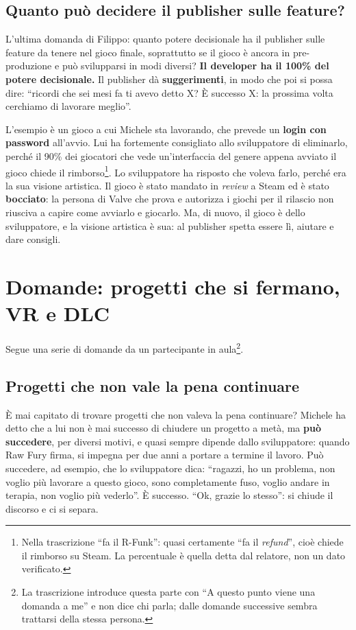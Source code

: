 \subsection{Quanto può decidere il publisher sulle feature?}

L'ultima domanda di Filippo: quanto potere decisionale ha il publisher sulle
feature da tenere nel gioco finale, soprattutto se il gioco è ancora in
pre-produzione e può svilupparsi in modi diversi? \textbf{Il developer ha il
100\% del potere decisionale.} Il publisher dà \textbf{suggerimenti}, in modo che
poi si possa dire: ``ricordi che sei mesi fa ti avevo detto X? È successo X:
la prossima volta cerchiamo di lavorare meglio''.

L'esempio è un gioco a cui Michele sta lavorando, che prevede un \textbf{login
con password} all'avvio. Lui ha fortemente consigliato allo sviluppatore di
eliminarlo, perché il 90\% dei giocatori che vede un'interfaccia del genere
appena avviato il gioco chiede il rimborso\footnote{Nella trascrizione ``fa il
R-Funk'': quasi certamente ``fa il \emph{refund}'', cioè chiede il rimborso su
Steam. La percentuale è quella detta dal relatore, non un dato verificato.}. Lo
sviluppatore ha risposto che voleva farlo, perché era la sua visione artistica.
Il gioco è stato mandato in \emph{review} a Steam ed è stato
\textbf{bocciato}: la persona di Valve che prova e autorizza i giochi per il
rilascio non riusciva a capire come avviarlo e giocarlo. Ma, di nuovo, il gioco
è dello sviluppatore, e la visione artistica è sua: al publisher spetta essere lì,
aiutare e dare consigli.

\section{Domande: progetti che si fermano, VR e DLC}
\label{sec:z4-qa-progetti}

Segue una serie di domande da un partecipante in aula\footnote{La trascrizione
introduce questa parte con ``A questo punto viene una domanda a me'' e non dice
chi parla; dalle domande successive sembra trattarsi della stessa persona.}.

\subsection{Progetti che non vale la pena continuare}

È mai capitato di trovare progetti che non valeva la pena continuare? Michele ha
detto che a lui non è mai successo di chiudere un progetto a metà, ma
\textbf{può succedere}, per diversi motivi, e quasi sempre dipende dallo
sviluppatore: quando Raw Fury firma, si impegna per due anni a portare a termine
il lavoro. Può succedere, ad esempio, che lo sviluppatore dica: ``ragazzi, ho un
problema, non voglio più lavorare a questo gioco, sono completamente fuso,
voglio andare in terapia, non voglio più vederlo''. È successo. ``Ok, grazie lo
stesso'': si chiude il discorso e ci si separa.

